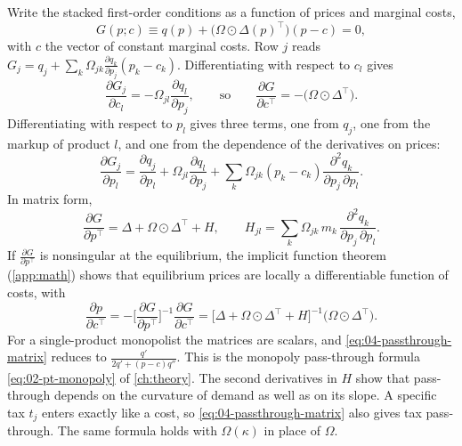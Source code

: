Write the stacked first-order conditions as a function of prices and marginal costs,
\begin{equation}\label{eq:04-G}
G(p; c) \equiv q(p) + \big(\Omega \odot \Delta(p)^\top\big)(p - c) = 0 ,
\end{equation}
with $c$ the vector of constant marginal costs. Row $j$ reads $G_j = q_j + \sum_k\Omega_{jk}\frac{\partial
q_k}{\partial p_j}(p_k - c_k)$. Differentiating with respect to $c_l$ gives
\begin{equation*}
\frac{\partial G_j}{\partial c_l} = -\Omega_{jl}\frac{\partial q_l}{\partial p_j},
\qquad\text{so}\qquad
\frac{\partial G}{\partial c^\top} = -\big(\Omega \odot \Delta^\top\big).
\end{equation*}
Differentiating with respect to $p_l$ gives three terms, one from $q_j$, one from the markup of product $l$, and
one from the dependence of the derivatives on prices:
\begin{equation*}
\frac{\partial G_j}{\partial p_l} = \frac{\partial q_j}{\partial p_l} + \Omega_{jl}\frac{\partial q_l}{\partial p_j}
+ \sum_k \Omega_{jk}(p_k - c_k)\frac{\partial^2 q_k}{\partial p_j\,\partial p_l} .
\end{equation*}
In matrix form,
\begin{equation}\label{eq:04-dGdp}
\frac{\partial G}{\partial p^\top} = \Delta + \Omega \odot \Delta^\top + H,
\qquad H_{jl} = \sum_k\Omega_{jk}\,m_k\,\frac{\partial^2 q_k}{\partial p_j\,\partial p_l} .
\end{equation}
If $\frac{\partial G}{\partial p^\top}$ is nonsingular at the equilibrium, the implicit function theorem
(\cref{app:math}) shows that equilibrium prices are locally a differentiable function of costs, with
\begin{equation}\label{eq:04-passthrough-matrix}
\frac{\partial p}{\partial c^\top} = -\Big[\frac{\partial G}{\partial p^\top}\Big]^{-1}\frac{\partial G}{\partial c^\top}
= \big[\Delta + \Omega \odot \Delta^\top + H\big]^{-1}\big(\Omega \odot \Delta^\top\big).
\end{equation}
For a single-product monopolist the matrices are scalars, and \eqref{eq:04-passthrough-matrix} reduces to
$\frac{q'}{2q' + (p - c)q''}$. This is the monopoly pass-through formula \eqref{eq:02-pt-monopoly} of
\cref{ch:theory}. The second derivatives in $H$ show that pass-through depends on the curvature of demand as
well as on its slope. A specific tax $t_j$ enters exactly like a cost, so \eqref{eq:04-passthrough-matrix} also gives
tax pass-through. The same formula holds with $\Omega(\kappa)$ in place of $\Omega$.

